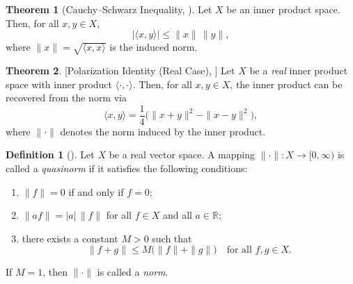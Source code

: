 \documentclass[preprint,12pt]{elsarticle}
\theoremstyle{definition}
\newtheorem{definition}{Definition}[section]
\newtheorem{theorem}{Theorem}[section]
\begin{document}
\begin{theorem}[Cauchy--Schwarz Inequality,  \cite{RynneYoungson2008}]\label{Cauchy--Schwarz Inequality}
	Let $X$ be an inner product space. Then, for all $x,y\in X$,
	\[
	|\langle x,y\rangle| \le \|x\|\,\|y\|,
\]
where $\|x\| = \sqrt{\langle x,x\rangle}$ is the induced norm.

\end{theorem}

\begin{theorem}\label{thm:PolarizationIdentity}[Polarization Identity (Real Case), \cite{RynneYoungson2008}]
Let $X$ be a \emph{real} inner product space with inner product $\langle \cdot, \cdot \rangle$.  
Then, for all $x, y \in X$, the inner product can be recovered from the norm via
\[
\langle x, y \rangle = \frac{1}{4} \Big( 
\|x+y\|^2 - \|x-y\|^2 
\Big),
\]
where $\|\cdot\|$ denotes the norm induced by the inner product.
\end{theorem}


\begin{definition}[\cite{Foralewski2024}]
	Let $X$ be a real vector space. A mapping $\|\cdot\|: X \to [0,\infty)$ is called a \emph{quasinorm} if it satisfies the following conditions:
	\begin{enumerate}[label=(\alph*)]
		\item $\|f\| = 0$ if and only if $f = 0$;
		\item $\|a f\| = |a|\,\|f\|$ for all $f \in X$ and all $a \in \mathbb{R}$;
		\item there exists a constant $M > 0$ such that
		\[
		\|f + g\| \leq M \bigl( \|f\| + \|g\| \bigr)
		\quad \text{for all } f,g \in X.
		\]
	\end{enumerate}
	If $M = 1$, then $\|\cdot\|$ is called a \emph{norm}.
\end{definition}
\end{document}
